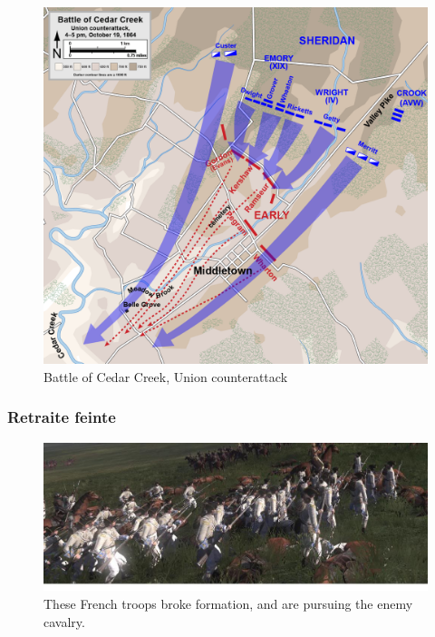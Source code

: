 \documentclass{article}
\begin{document}
\begin{figure}[H]
	\begin{centering}
	\includegraphics[width=\linewidth]{../ressources/Cedar_Creek_Union_counterattack}
	\caption{Battle of Cedar Creek, Union counterattack}
	\end{centering}
\end{figure}
\cite{counterattack_wiki, couterattack_cedar_creek}

\subsubsection{Retraite feinte}
\begin{figure}[H]
	\begin{centering}
	\includegraphics[width=\linewidth]{../ressources/infantrysquare3}
	\caption{These French troops broke formation, and are pursuing the enemy cavalry. \cite{feigned_retreat}}
	\end{centering}
\end{figure}
\cite{mongol_army}
\end{document}
